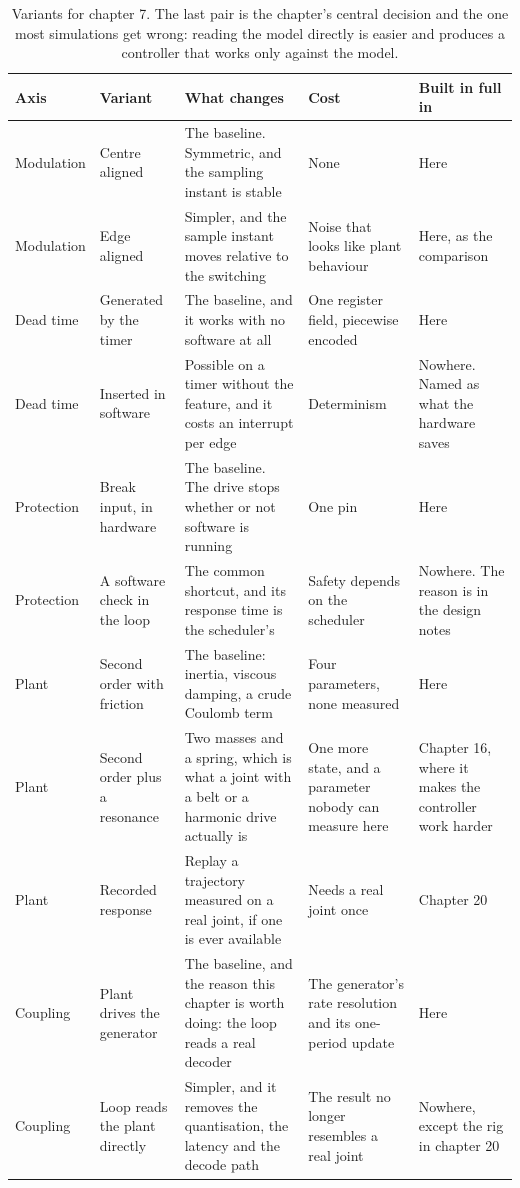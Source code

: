 \begin{table}[H]\centering\small
\begin{tabular}{p{24mm}p{26mm}p{44mm}p{22mm}p{20mm}}
\toprule
Axis & Variant & What changes & Cost & Built in full in \\
\midrule
Modulation & Centre aligned & The baseline. Symmetric, and the sampling instant is stable & None & Here \\
Modulation & Edge aligned & Simpler, and the sample instant moves relative to the switching & Noise that looks like plant behaviour & Here, as the comparison \\
Dead time & Generated by the timer & The baseline, and it works with no software at all & One register field, piecewise encoded & Here \\
Dead time & Inserted in software & Possible on a timer without the feature, and it costs an interrupt per edge & Determinism & Nowhere. Named as what the hardware saves \\
Protection & Break input, in hardware & The baseline. The drive stops whether or not software is running & One pin & Here \\
Protection & A software check in the loop & The common shortcut, and its response time is the scheduler's & Safety depends on the scheduler & Nowhere. The reason is in the design notes \\
Plant & Second order with friction & The baseline: inertia, viscous damping, a crude Coulomb term & Four parameters, none measured & Here \\
Plant & Second order plus a resonance & Two masses and a spring, which is what a joint with a belt or a harmonic drive actually is & One more state, and a parameter nobody can measure here & Chapter 16, where it makes the controller work harder \\
Plant & Recorded response & Replay a trajectory measured on a real joint, if one is ever available & Needs a real joint once & Chapter 20 \\
Coupling & Plant drives the generator & The baseline, and the reason this chapter is worth doing: the loop reads a real decoder & The generator's rate resolution and its one-period update & Here \\
Coupling & Loop reads the plant directly & Simpler, and it removes the quantisation, the latency and the decode path & The result no longer resembles a real joint & Nowhere, except the rig in chapter 20 \\
\bottomrule
\end{tabular}
\caption{Variants for chapter 7. The last pair is the chapter's central decision and the one most simulations get wrong: reading the model directly is easier and produces a controller that works only against the model.}
\end{table}

